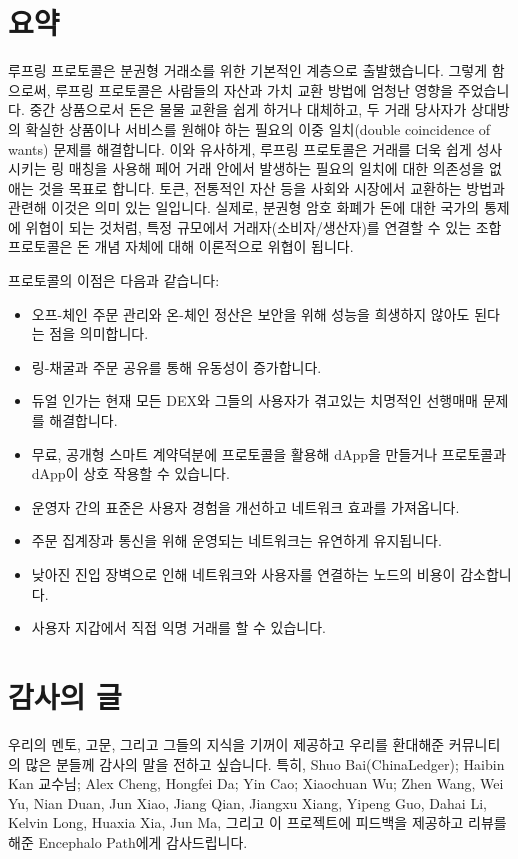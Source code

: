 \documentclass[UTF8,nofonts]{article}
\begin{document}
\begin{multicols}{2}
\section{요약}

루프링 프로토콜은 분권형 거래소를 위한 기본적인 계층으로 출발했습니다. 그렇게 함으로써, 루프링 프로토콜은 사람들의 자산과 가치 교환 방법에 엄청난 영향을 주었습니다. 중간 상품으로서 돈은 물물 교환을 쉽게 하거나 대체하고, 두 거래 당사자가 상대방의 확실한 상품이나 서비스를 원해야 하는 필요의 이중 일치(double coincidence of wants) 문제\cite{unenumerated2006}를 해결합니다. 이와 유사하게, 루프링 프로토콜은 거래를 더욱 쉽게 성사시키는 링 매칭을 사용해 페어 거래 안에서 발생하는 필요의 일치에 대한 의존성을 없애는 것을 목표로 합니다. 토큰, 전통적인 자산 등을 사회와 시장에서 교환하는 방법과 관련해 이것은 의미 있는 일입니다. 실제로, 분권형 암호 화폐가 돈에 대한 국가의 통제에 위협이 되는 것처럼, 특정 규모에서 거래자(소비자/생산자)를 연결할 수 있는 조합 프로토콜은 돈 개념 자체에 대해 이론적으로 위협이 됩니다.  

프로토콜의 이점은 다음과 같습니다:

\begin{itemize}
	\item 오프-체인 주문 관리와 온-체인 정산은 보안을 위해 성능을 희생하지 않아도 된다는 점을 의미합니다.
	\item 링-채굴과 주문 공유를 통해 유동성이 증가합니다.
	\item 듀얼 인가는 현재 모든 DEX와 그들의 사용자가 겪고있는 치명적인 선행매매 문제를 해결합니다.
	\item 무료, 공개형 스마트 계약덕분에 프로토콜을 활용해 dApp을 만들거나 프로토콜과 dApp이 상호 작용할 수 있습니다.
	\item 운영자 간의 표준은 사용자 경험을 개선하고 네트워크 효과를 가져옵니다.
	\item 주문 집계장과 통신을 위해 운영되는 네트워크는 유연하게 유지됩니다.
	\item 낮아진 진입 장벽으로 인해 네트워크와 사용자를 연결하는 노드의 비용이 감소합니다. 
	\item 사용자 지갑에서 직접 익명 거래를 할 수 있습니다.
\end{itemize}

\section{감사의 글}

우리의 멘토, 고문, 그리고 그들의 지식을 기꺼이 제공하고 우리를 환대해준 커뮤니티의 많은 분들께 감사의 말을 전하고 싶습니다. 특히, Shuo Bai(ChinaLedger); Haibin Kan 교수님; Alex Cheng, Hongfei Da; Yin Cao; Xiaochuan Wu; Zhen Wang, Wei Yu, Nian Duan, Jun Xiao, Jiang Qian, Jiangxu Xiang, Yipeng Guo, Dahai Li, Kelvin Long, Huaxia Xia, Jun Ma, 그리고 이 프로젝트에 피드백을 제공하고 리뷰를 해준 Encephalo Path에게 감사드립니다.





%
\end{multicols}
\end{document}
